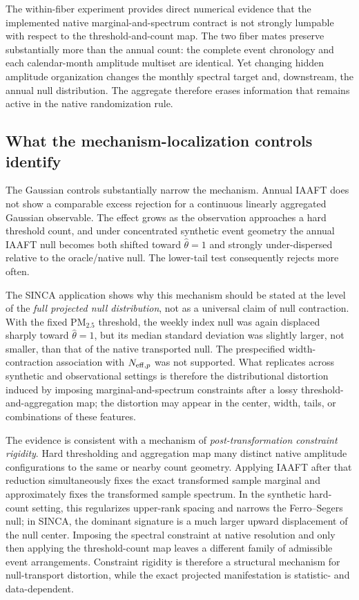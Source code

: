 The within-fiber experiment provides direct numerical evidence that the implemented native marginal-and-spectrum contract is not strongly lumpable with respect to the threshold-and-count map. The two fiber mates preserve substantially more than the annual count: the complete event chronology and each calendar-month amplitude multiset are identical. Yet changing hidden amplitude organization changes the monthly spectral target and, downstream, the annual null distribution. The aggregate therefore erases information that remains active in the native randomization rule.

\subsection{What the mechanism-localization controls identify}\label{sec:discussionmechanism}

The Gaussian controls substantially narrow the mechanism. Annual IAAFT does not show a comparable excess rejection for a continuous linearly aggregated Gaussian observable. The effect grows as the observation approaches a hard threshold count, and under concentrated synthetic event geometry the annual IAAFT null becomes both shifted toward $\widehat\theta=1$ and strongly under-dispersed relative to the oracle/native null. The lower-tail test consequently rejects more often.

The SINCA application shows why this mechanism should be stated at the level of the \emph{full projected null distribution}, not as a universal claim of null contraction. With the fixed PM$_{2.5}$ threshold, the weekly index null was again displaced sharply toward $\widehat\theta=1$, but its median standard deviation was slightly larger, not smaller, than that of the native transported null. The prespecified width-contraction association with $N_{\mathrm{eff},p}$ was not supported. What replicates across synthetic and observational settings is therefore the distributional distortion induced by imposing marginal-and-spectrum constraints after a lossy threshold-and-aggregation map; the distortion may appear in the center, width, tails, or combinations of these features.

The evidence is consistent with a mechanism of \emph{post-transformation constraint rigidity}. Hard thresholding and aggregation map many distinct native amplitude configurations to the same or nearby count geometry. Applying IAAFT after that reduction simultaneously fixes the exact transformed sample marginal and approximately fixes the transformed sample spectrum. In the synthetic hard-count setting, this regularizes upper-rank spacing and narrows the Ferro--Segers null; in SINCA, the dominant signature is a much larger upward displacement of the null center. Imposing the spectral constraint at native resolution and only then applying the threshold-count map leaves a different family of admissible event arrangements. Constraint rigidity is therefore a structural mechanism for null-transport distortion, while the exact projected manifestation is statistic- and data-dependent.

